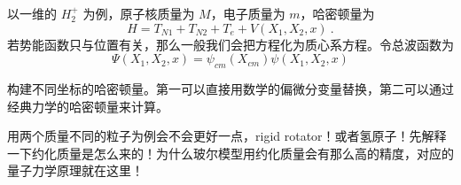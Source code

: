 
\begin{issues}
\issueDraft
\end{issues}

以一维的 $H_2^+$ 为例，原子核质量为 $M$，电子质量为 $m$，哈密顿量为
\begin{equation}
H = T_{N1} + T_{N2} + T_{e} + V(X_1,X_2,x)~.
\end{equation}
若势能函数只与位置有关，那么一般我们会把方程化为质心系方程。令总波函数为
\begin{equation}
\Psi(X_1,X_2,x) = \psi_{cm}(X_{cm})\psi(X_1,X_2,x)
\end{equation}

构建不同坐标的哈密顿量。第一可以直接用数学的偏微分变量替换，第二可以通过经典力学的哈密顿量来计算。

用两个质量不同的粒子为例会不会更好一点，rigid rotator！或者氢原子！先解释一下约化质量是怎么来的！为什么玻尔模型用约化质量会有那么高的精度，对应的量子力学原理就在这里！